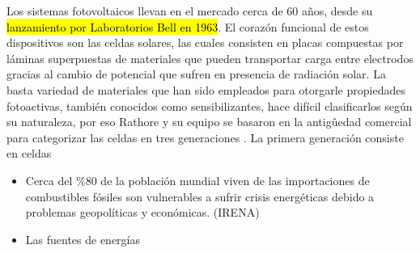 Los sistemas fotovoltaicos llevan en el mercado cerca de 60 años, desde su \hl{lanzamiento por Laboratorios Bell en 1963}. El corazón funcional de estos 
dispositivos son las celdas solares, las cuales consisten en placas compuestas por láminas superpuestas de materiales que pueden transportar carga 
entre electrodos gracias al cambio de potencial que sufren en presencia de radiación solar. La basta variedad de materiales que han sido empleados para 
otorgarle propiedades fotoactivas, también conocidos como sensibilizantes, hace difícil clasificarlos según su naturaleza, por eso Rathore y su equipo 
se basaron en la antigûedad comercial para categorizar las celdas en tres generaciones \cite{rathore2021}. La primera generación consiste en celdas 




\begin{itemize}
    \item Cerca del \%80 de la población mundial viven de las importaciones 
     de combustibles fósiles son vulnerables a sufrir crisis energéticas
     debido a problemas geopolíticas y económicas.
     (IRENA)
    
    \item Las fuentes de energías 
\end{itemize}
